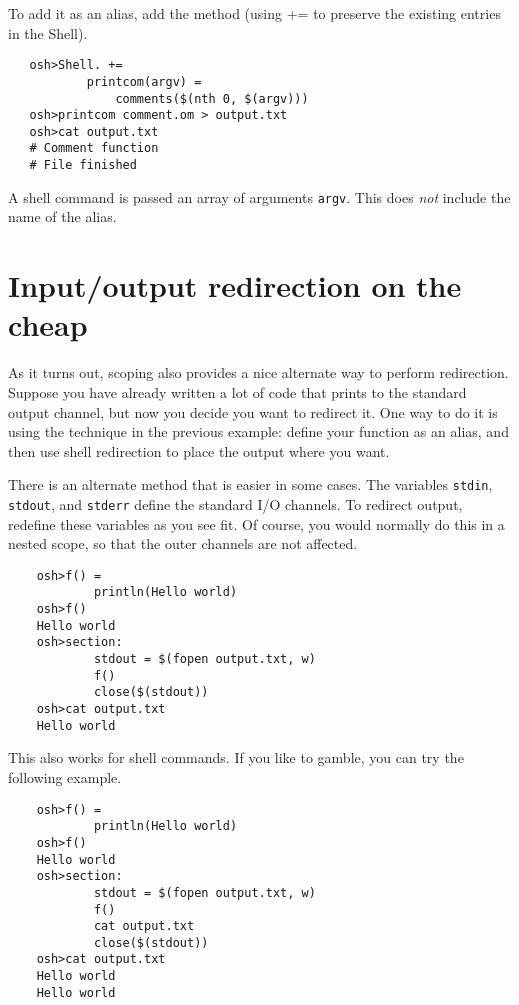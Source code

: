 To add it as an alias, add the method (using += to preserve the existing entries in the Shell).

\begin{verbatim}
   osh>Shell. +=
           printcom(argv) =
               comments($(nth 0, $(argv)))
   osh>printcom comment.om > output.txt
   osh>cat output.txt
   # Comment function
   # File finished
\end{verbatim}

A shell command is passed an array of arguments \verb+argv+.  This does \emph{not} include the name
of the alias.

\section{Input/output redirection on the cheap}

As it turns out, scoping also provides a nice alternate way to perform redirection.  Suppose you
have already written a lot of code that prints to the standard output channel, but now you decide
you want to redirect it.  One way to do it is using the technique in the previous example: define
your function as an alias, and then use shell redirection to place the output where you want.

There is an alternate method that is easier in some cases.  The variables \verb+stdin+,
\verb+stdout+, and \verb+stderr+ define the standard I/O channels.  To redirect output, redefine
these variables as you see fit.  Of course, you would normally do this in a nested scope, so that
the outer channels are not affected.

\begin{verbatim}
    osh>f() =
            println(Hello world)
    osh>f()
    Hello world
    osh>section:
            stdout = $(fopen output.txt, w)
            f()
            close($(stdout))
    osh>cat output.txt
    Hello world
\end{verbatim}

This also works for shell commands.  If you like to gamble, you can try the following example.

\begin{verbatim}
    osh>f() =
            println(Hello world)
    osh>f()
    Hello world
    osh>section:
            stdout = $(fopen output.txt, w)
            f()
            cat output.txt
            close($(stdout))
    osh>cat output.txt
    Hello world
    Hello world
\end{verbatim}

